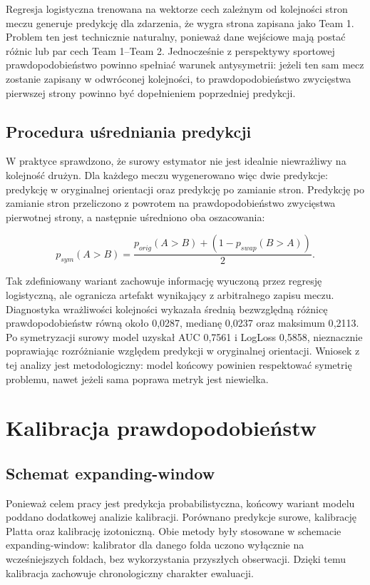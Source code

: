 Regresja logistyczna trenowana na wektorze cech zależnym od kolejności stron meczu generuje predykcję dla zdarzenia, że wygra strona zapisana jako Team 1. Problem ten jest technicznie naturalny, ponieważ dane wejściowe mają postać różnic lub par cech Team 1--Team 2. Jednocześnie z perspektywy sportowej prawdopodobieństwo powinno spełniać warunek antysymetrii: jeżeli ten sam mecz zostanie zapisany w odwróconej kolejności, to prawdopodobieństwo zwycięstwa pierwszej strony powinno być dopełnieniem poprzedniej predykcji.

\subsection{Procedura uśredniania predykcji}

W praktyce sprawdzono, że surowy estymator nie jest idealnie niewrażliwy na kolejność drużyn. Dla każdego meczu wygenerowano więc dwie predykcje: predykcję w oryginalnej orientacji oraz predykcję po zamianie stron. Predykcję po zamianie stron przeliczono z powrotem na prawdopodobieństwo zwycięstwa pierwotnej strony, a następnie uśredniono oba oszacowania:

\begin{equation}
    p_{sym}(A>B) = \frac{p_{orig}(A>B) + \left(1 - p_{swap}(B>A)\right)}{2}.
    \label{eq:symmetrized_prediction}
\end{equation}

Tak zdefiniowany wariant zachowuje informację wyuczoną przez regresję logistyczną, ale ogranicza artefakt wynikający z arbitralnego zapisu meczu. Diagnostyka wrażliwości kolejności wykazała średnią bezwzględną różnicę prawdopodobieństw równą około 0{,}0287, medianę 0{,}0237 oraz maksimum 0{,}2113. Po symetryzacji surowy model uzyskał AUC 0{,}7561 i LogLoss 0{,}5858, nieznacznie poprawiając rozróżnianie względem predykcji w oryginalnej orientacji. Wniosek z tej analizy jest metodologiczny: model końcowy powinien respektować symetrię problemu, nawet jeżeli sama poprawa metryk jest niewielka.

\section{Kalibracja prawdopodobieństw}

\subsection{Schemat expanding-window}

Ponieważ celem pracy jest predykcja probabilistyczna, końcowy wariant modelu poddano dodatkowej analizie kalibracji. Porównano predykcje surowe, kalibrację Platta oraz kalibrację izotoniczną. Obie metody były stosowane w schemacie expanding-window: kalibrator dla danego folda uczono wyłącznie na wcześniejszych foldach, bez wykorzystania przyszłych obserwacji. Dzięki temu kalibracja zachowuje chronologiczny charakter ewaluacji.

